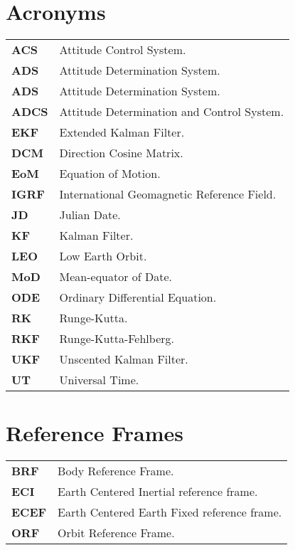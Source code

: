 \section*{Acronyms}
\begin{table}[H]
\label{tab:acrs}
\begin{tabular}{ll}
\textbf{ACS} & Attitude Control System.\\
\textbf{ADS} & Attitude Determination System.\\
\textbf{ADS} & Attitude Determination System.\\
\textbf{ADCS} & Attitude Determination and Control System.\\
\textbf{EKF} & Extended Kalman Filter.\\
\textbf{DCM} & Direction Cosine Matrix. \\
\textbf{EoM} & Equation of Motion. \\
\textbf{IGRF} & International Geomagnetic Reference Field. \\
\textbf{JD} & Julian Date. \\
\textbf{KF} &  Kalman Filter.\\
\textbf{LEO} & Low Earth Orbit. \\
\textbf{MoD} &  Mean-equator of Date. \\
\textbf{ODE} & Ordinary Differential Equation. \\
\textbf{RK} & Runge-Kutta. \\
\textbf{RKF} & Runge-Kutta-Fehlberg. \\
\textbf{UKF} & Unscented Kalman Filter. \\
\textbf{UT} & Universal Time. \\


\end{tabular}%
\end{table}

\section*{Reference Frames}
\begin{table}[H]
\label{tab:refframes}
\begin{tabular}{ll}
\textbf{BRF} & Body Reference Frame.\\
\textbf{ECI} & Earth Centered Inertial reference frame. \\
\textbf{ECEF} & Earth Centered Earth Fixed reference frame. \\
\textbf{ORF} & Orbit Reference Frame. 
\end{tabular}%
\end{table}

\clearpage

